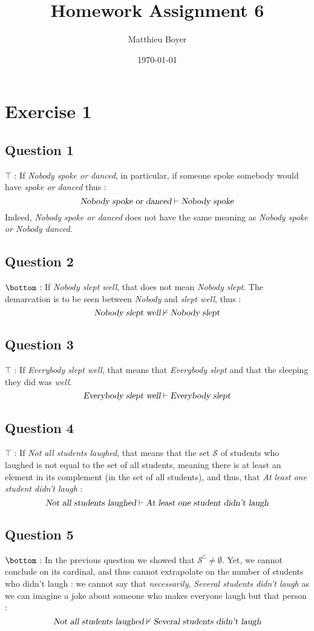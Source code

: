 \documentclass{cours}
\title{Homework Assignment 6}
\date{\today}
\author{Matthieu Boyer}
\begin{document}
    \section{Exercise 1}
        \subsection{Question 1}
        $\top$ : If \textsl{Nobody spoke or danced}, in particular, if someone spoke somebody would have \textsl{spoke or danced} thus : 
        \[
            \textsl{Nobody spoke or danced} \vdash \textsl{Nobody spoke}
        \]  
        Indeed, \textsl{Nobody spoke or danced} does not have the same meaning as \textsl{Nobody spoke or Nobody danced}.

        \subsection{Question 2}
        $\bottom$ : If \textsl{Nobody slept well}, that does not mean \textsl{Nobody slept}. The demarcation is to be seen between \textsl{Nobody} and \textsl{slept well}, thus :
        \[
            \textsl{Nobody slept well} \nvdash \textsl{Nobody slept}
        \]

        \subsection{Question 3}
        $\top$ : If \textsl{Everybody slept well}, that means that \textsl{Everybody slept} and that the sleeping they did was \textsl{well}.
        \[
            \textsl{Everybody slept well} \vdash \textsl{Everybody slept}
        \]

        \subsection{Question 4}
        $\top$ : If \textsl{Not all students laughed}, that means that the set $\mathscr{S}$ of students who laughed is not equal to the set of all students, meaning there is at least an element in its complement (in the set of all students), and thus, that \textsl{At least one student didn't laugh} :
        \[
            \textsl{Not all students laughed} \vdash \textsl{At least one student didn't laugh}
        \]

        \subsection{Question 5}
        $\bottom$ : In the previous question we showed that $\mathscr{S}^{\complement} \neq \emptyset$. Yet, we cannot conclude on its cardinal, and thus cannot extrapolate on the number of students who didn't laugh : we cannot say that \emph{necessarily}, \textsl{Several students didn't laugh} as we can imagine a joke about someone who makes everyone laugh but that person :
        \[
            \textsl{Not all students laughed}  \nvdash \textsl{Several students didn't laugh}
        \]
\end{document}
